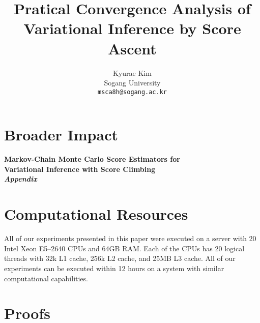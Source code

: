 \documentclass{article}
\title{Pratical Convergence Analysis of \\ Variational Inference by Score Ascent}
\author{%
  Kyurae Kim \\
  Sogang University \\
  \texttt{msca8h@sogang.ac.kr} \\
}
\begin{document}
\maketitle

\begin{abstract}
  
\end{abstract}








\section*{Broader Impact}

\begin{ack}
\end{ack}



\newpage
\appendix

\begin{center}
  \LARGE\bf
  Markov-Chain Monte Carlo Score Estimators for \\
  Variational Inference with Score Climbing \\
  \textit{Appendix}
\end{center}

\section{Computational Resources}\label{section:resources}
 All of our experiments presented in this paper were executed on a server with 20 Intel Xeon E5--2640 CPUs and 64GB RAM.
Each of the CPUs has 20 logical threads with 32k L1 cache, 256k L2 cache, and 25MB L3 cache.
All of our experiments can be executed within 12 hours on a system with similar computational capabilities.





\section{Proofs}\label{section:proofs}
%
%
\printProofs
\end{document}
